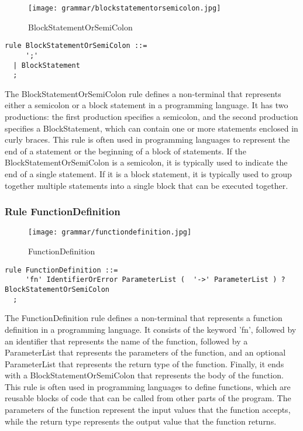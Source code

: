 \begin{figure}[!ht]
\centering
\texttt{[image: grammar/blockstatementorsemicolon.jpg]}
\caption{BlockStatementOrSemiColon}
\end{figure}

\begin{lstlisting}
rule BlockStatementOrSemiColon ::=
     ';' 
  | BlockStatement 
  ;
\end{lstlisting}

The BlockStatementOrSemiColon rule defines a non-terminal that represents either a semicolon or a block statement in a programming language. It has two productions: the first production specifies a semicolon, and the second production specifies a BlockStatement, which can contain one or more statements enclosed in curly braces. This rule is often used in programming languages to represent the end of a statement or the beginning of a block of statements. If the BlockStatementOrSemiColon is a semicolon, it is typically used to indicate the end of a single statement. If it is a block statement, it is typically used to group together multiple statements into a single block that can be executed together.

\subsubsection*{Rule FunctionDefinition}

\begin{figure}[!ht]
\centering
\texttt{[image: grammar/functiondefinition.jpg]}
\caption{FunctionDefinition}
\end{figure}


\begin{lstlisting}
rule FunctionDefinition ::=
     'fn' IdentifierOrError ParameterList (  '->' ParameterList ) ?  BlockStatementOrSemiColon 
  ;
\end{lstlisting}

The FunctionDefinition rule defines a non-terminal that represents a function definition in a programming language. It consists of the keyword 'fn', followed by an identifier that represents the name of the function, followed by a ParameterList that represents the parameters of the function, and an optional ParameterList that represents the return type of the function. Finally, it ends with a BlockStatementOrSemiColon that represents the body of the function. This rule is often used in programming languages to define functions, which are reusable blocks of code that can be called from other parts of the program. The parameters of the function represent the input values that the function accepts, while the return type represents the output value that the function returns.


